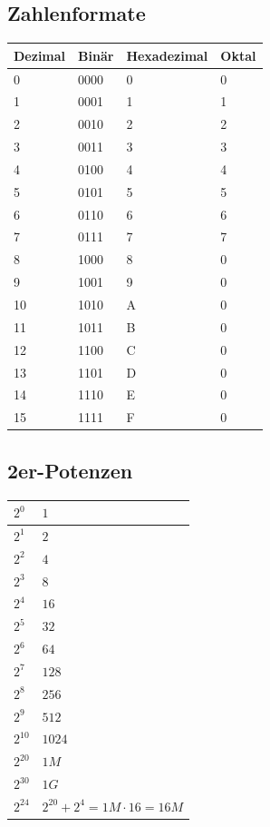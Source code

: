 \subsection{Zahlenformate}
\begin{multicols}{2}
	\renewcommand{\arraystretch}{1.2}
	\begin{tabular}{|l|l|l|l|}
		\hline \textbf{Dezimal} & \textbf{Binär} & \textbf{Hexadezimal} & \textbf{Oktal}\\
		\hline 0 & 0000 & 0 & 0\\
		\hline 1 & 0001 & 1 & 1\\
		\hline 2 & 0010 & 2 & 2\\
		\hline 3 & 0011 & 3 & 3\\
		\hline 4 & 0100 & 4 & 4\\
		\hline 5 & 0101 & 5 & 5\\
		\hline 6 & 0110 & 6 & 6\\
		\hline 7 & 0111 & 7 & 7\\
		\hline 8 & 1000 & 8 & 0\\
		\hline 9 & 1001 & 9 & 0\\
		\hline 10 & 1010 & A & 0\\
		\hline 11 & 1011 & B & 0\\
		\hline 12 & 1100 & C & 0\\
		\hline 13 & 1101 & D & 0\\
		\hline 14 & 1110 & E & 0\\
		\hline 15 & 1111 & F & 0\\
		\hline
	\end{tabular}

\subsection{2er-Potenzen}
\begin{tabular}{|l|l|}
			\hline $2^0$ & $1$\\
			\hline $2^1$ & $2$\\
			\hline $2^2$ & $4$\\
			\hline $2^3$ & $8$\\
			\hline $2^4$ & $16$\\
			\hline $2^5$ & $32$\\
			\hline $2^6$ & $64$\\
			\hline $2^7$ & $128$\\
			\hline $2^8$ & $256$\\
			\hline $2^9$ & $512$\\
			\hline $2^{10}$ & $1024$\\
			\hline $2^{20}$ & $1 M$\\
			\hline $2^{30}$ & $1 G$\\
			\hline $2^{24}$ & $2^{20} +2^4 = 1M \cdot 16 = 16M$\\
			\hline
\end{tabular}
\end{multicols}
\clearpage
\pagebreak